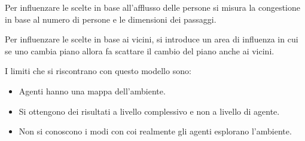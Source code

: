 Per influenzare le scelte in base all'afflusso delle persone si misura la congestione
in base al numero di persone e le dimensioni dei passaggi.

Per influenzare le scelte in base ai vicini, si introduce un area di influenza
in cui se uno cambia piano allora fa scattare il cambio del piano anche ai vicini.

I limiti che si riscontrano con questo modello sono:
\begin{itemize}
    \item Agenti hanno una mappa dell'ambiente.
    \item Si ottengono dei risultati a livello complessivo e non a livello di agente.
    \item Non si conoscono i modi con coi realmente gli agenti esplorano l'ambiente.
\end{itemize}